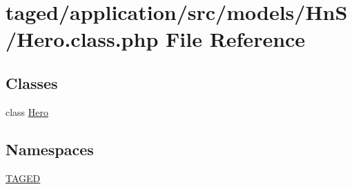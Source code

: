 \hypertarget{_hero_8class_8php}{}\section{taged/application/src/models/\+Hn\+S/\+Hero.class.\+php File Reference}
\label{_hero_8class_8php}
\subsection*{Classes}
\begin{DoxyCompactItemize}
\item 
class \hyperlink{class_hero}{Hero}
\end{DoxyCompactItemize}
\subsection*{Namespaces}
\begin{DoxyCompactItemize}
\item 
 \hyperlink{namespace_t_a_g_e_d}{T\+A\+G\+ED}
\end{DoxyCompactItemize}
